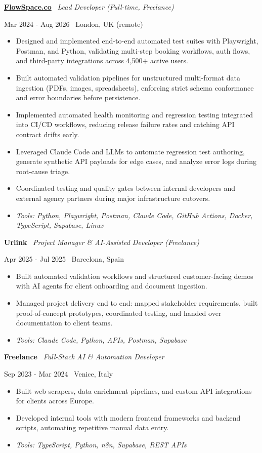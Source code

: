 \documentclass[a4paper,10pt]{article}
\newcommand{\role}[4]{%
 \vspace{2pt}\noindent
 \begin{minipage}[t]{0.70\textwidth}\raggedright\textbf{#1} \textbullet\ \textit{#3}\end{minipage}%
 \hfill
 \begin{minipage}[t]{0.28\textwidth}\raggedleft\footnotesize\color{gray}#2 \textbullet\ #4\end{minipage}%
 \vspace{1pt}%
}
\begin{document}
\role{\href{https://flowspace.co}{FlowSpace.co}}{Mar 2024 - Aug 2026}{Lead Developer (Full-time, Freelance)}{London, UK (remote)}
\begin{itemize}
 \item Designed and implemented end-to-end automated test suites with Playwright, Postman, and Python, validating multi-step booking workflows, auth flows, and third-party integrations across 4,500+ active users.
 \item Built automated validation pipelines for unstructured multi-format data ingestion (PDFs, images, spreadsheets), enforcing strict schema conformance and error boundaries before persistence.
 \item Implemented automated health monitoring and regression testing integrated into CI/CD workflows, reducing release failure rates and catching API contract drifts early.
 \item Leveraged Claude Code and LLMs to automate regression test authoring, generate synthetic API payloads for edge cases, and analyze error logs during root-cause triage.
 \item Coordinated testing and quality gates between internal developers and external agency partners during major infrastructure cutovers.
 \item \textit{Tools: Python, Playwright, Postman, Claude Code, GitHub Actions, Docker, TypeScript, Supabase, Linux}
\end{itemize}

\role{Urlink}{Apr 2025 - Jul 2025}{Project Manager \& AI-Assisted Developer (Freelance)}{Barcelona, Spain}
\begin{itemize}
 \item Built automated validation workflows and structured customer-facing demos with AI agents for client onboarding and document ingestion.
 \item Managed project delivery end to end: mapped stakeholder requirements, built proof-of-concept prototypes, coordinated testing, and handed over documentation to client teams.
 \item \textit{Tools: Claude Code, Python, APIs, Postman, Supabase}
\end{itemize}

\role{Freelance}{Sep 2023 - Mar 2024}{Full-Stack AI \& Automation Developer}{Venice, Italy}
\begin{itemize}
 \item Built web scrapers, data enrichment pipelines, and custom API integrations for clients across Europe.
 \item Developed internal tools with modern frontend frameworks and backend scripts, automating repetitive manual data entry.
 \item \textit{Tools: TypeScript, Python, n8n, Supabase, REST APIs}
\end{itemize}
\end{document}
